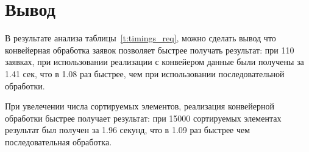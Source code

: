 \section*{Вывод}
В результате анализа таблицы~\ref{t:timings_req}, можно сделать вывод что конвейерная обработка заявок позволяет быстрее получать результат: при 110 заявках, при использовании реализации с конвейером данные были получены за 1.41 сек, что в 1.08 раз быстрее, чем при использовании последовательной обработки.

При увелечении числа сортируемых элементов, реализация конвейерной обработки быстрее получает результат: при 15000 сортируемых элементах результат был получен за
1.96 секунд, что в 1.09 раз быстрее чем последовательная обработка.

